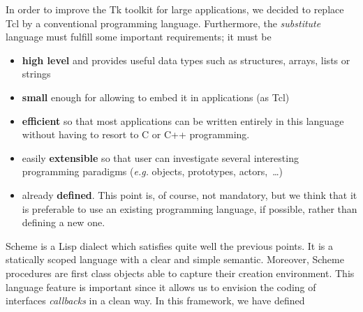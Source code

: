 In order to improve the Tk toolkit for large applications, we decided
to replace Tcl by a conventional programming language. Furthermore,
the {\em substitute} language must fulfill some important
requirements; it must be
\begin{itemize}
\item {\bf high level} and provides useful data types such as 
structures, arrays, lists or strings 
\item {\bf small} enough for allowing to embed it in
applications (as Tcl) 
\item {\bf efficient} so that most applications can be written
entirely in this language without having to resort to C or C++ programming.
\item easily {\bf extensible} so that user can investigate several
interesting programming paradigms ({\em e.g.} objects, prototypes,
actors,~\ldots)
\item already {\bf defined}. This point is, of course, not mandatory, but we
think that it is preferable to use an existing programming language, if
possible, rather than defining a new one.
\end{itemize}
Scheme \cite{R4RS} is a Lisp dialect which satisfies quite well the
previous points. It is a statically scoped language with a clear and
simple semantic. Moreover, Scheme procedures are first class objects
able to capture their creation environment. This language feature is
important since it allows us to envision the coding of interfaces {\em
callbacks} in a clean way. In this framework, we have defined
